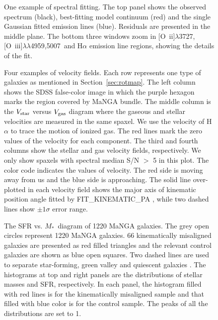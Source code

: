 \documentclass[a4paper,fleqn,usenatbib]{mnras}
\newcommand{\mstar}{$M_*$}
\newcommand{\oii}{[{O~\sc ii}]$\lambda$3727}
\newcommand{\oiii}{[{O~\sc iii}]$\lambda\lambda$4959,5007}
\begin{document}
\begin{figure}
  \begin{center}
    
  \end{center}
  \caption{One example of spectral fitting. The top panel shows the observed spectrum (black), best-fitting model continuum (red) and the single Gaussian fitted emission lines (blue). Residuals are presented in the middle plane. The bottom three windows zoom in \oii, \oiii\ and H$\alpha$ emission line regions, showing the details of the fit.}
  \label{fig:spectra_fit}
\end{figure}

\begin{figure}
  \begin{center}
    
  \end{center}
  \caption{Four examples of velocity fields. Each row represents one type of galaxies as mentioned in Section~\ref{sec:rotmap}. The left column shows the SDSS false-color image in which the purple hexagon marks the region covered by MaNGA bundle. The middle column is the $V_{\rm star}$ versus $V_{\rm gas}$ diagram where the gaseous and stellar velocities are measured in the same spaxel. We use the velocity of H$\alpha$ to trace the motion of ionized gas. The red lines mark the zero values of the velocity for each component. 
The third and fourth columns show the stellar and gas velocity fields, respectively. We only show spaxels with spectral median S/N $>$ 5 in this plot. The color code indicates the values of velocity. The red side is moving away from us and the blue side is approaching. The solid line over-plotted in each velocity field shows the major axis of kinematic position angle fitted by FIT\_KINEMATIC\_PA \citep{krajnovic-2006}, while two dashed lines show $\pm1\sigma$ error range.}
  \label{fig:example_galaxy}
\end{figure}

\begin{figure}
  \begin{center}
    
  \end{center}
  \caption{The SFR vs. \mstar\ diagram of 1220 MaNGA galaxies. The grey open circles represent 1220 MaNGA galaxies. 66 kinematically misaligned galaxies are presented as red filled triangles and the relevant control galaxies are shown as blue open squares. Two dashed lines are used to separate star-forming, green valley and quiescent galaxies \citep{chen-prep}. The histograms at top and right panels are the distributions of stellar masses and SFR, respectively. In each panel, the histogram filled with red lines is for the kinematically misaligned sample and that filled with blue color is for the control sample. The peaks of all the distributions are set to 1.}
  \label{fig:control_sample}
\end{figure}
\end{document}
